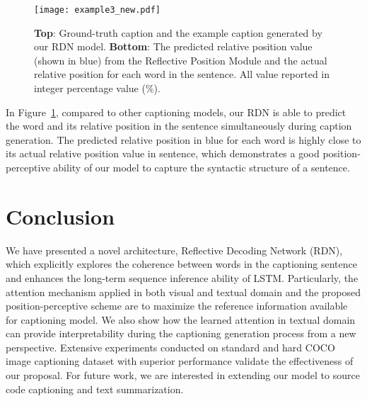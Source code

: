 \documentclass[10pt,twocolumn,letterpaper]{article}
\begin{document}
\begin{figure}[t]
	\centering
	\texttt{[image: example3\_new.pdf]}
\caption{\textbf{Top}: Ground-truth caption and the example caption generated by our RDN model. \textbf{Bottom}: The predicted relative position value (shown in blue) from the Reflective Position Module and the actual relative position for each word in the sentence. All value reported in integer percentage value (\%). }
\label{fig:example3}
	\vspace{-0.1in}
\end{figure}

In Figure~\ref{fig:example3}, compared to other captioning models, our RDN is able to predict the word and its relative position in the sentence simultaneously during caption generation.
The predicted relative position in blue for each word is highly close to its actual relative position value in sentence, which demonstrates a good position-perceptive ability of our model to capture the syntactic structure of a sentence.



 
\vspace{-2mm}

\section{Conclusion}
We have presented a novel architecture, Reflective Decoding Network (RDN), which explicitly explores the coherence between words in the captioning sentence and enhances the long-term sequence inference ability of LSTM.
Particularly, the attention mechanism applied in both visual and textual domain and the proposed position-perceptive scheme are to maximize the reference information available for captioning model.
We also show how the learned attention in textual domain can provide interpretability during the captioning generation process from a new perspective.
Extensive experiments conducted on standard and hard COCO image captioning dataset with superior performance validate the effectiveness of our proposal.
For future work, we are interested in extending our model to source code captioning and text summarization.

 
{\small
	
	
}
\end{document}
